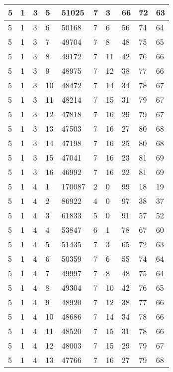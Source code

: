 \begin{table}[!ht]
\begin{tabular}{|l|l|l|l|l|l|l|l|l|l|}
        5 & 1 & 3 & 5 & 51025 & 7 & 3 & 66 & 72 & 63 \\ \hline
        5 & 1 & 3 & 6 & 50168 & 7 & 6 & 56 & 74 & 64 \\ \hline
        5 & 1 & 3 & 7 & 49704 & 7 & 8 & 48 & 75 & 65 \\ \hline
        5 & 1 & 3 & 8 & 49172 & 7 & 11 & 42 & 76 & 66 \\ \hline
        5 & 1 & 3 & 9 & 48975 & 7 & 12 & 38 & 77 & 66 \\ \hline
        5 & 1 & 3 & 10 & 48472 & 7 & 14 & 34 & 78 & 67 \\ \hline
        5 & 1 & 3 & 11 & 48214 & 7 & 15 & 31 & 79 & 67 \\ \hline
        5 & 1 & 3 & 12 & 47818 & 7 & 16 & 29 & 79 & 67 \\ \hline
        5 & 1 & 3 & 13 & 47503 & 7 & 16 & 27 & 80 & 68 \\ \hline
        5 & 1 & 3 & 14 & 47198 & 7 & 16 & 25 & 80 & 68 \\ \hline
        5 & 1 & 3 & 15 & 47041 & 7 & 16 & 23 & 81 & 69 \\ \hline
        5 & 1 & 3 & 16 & 46992 & 7 & 16 & 22 & 81 & 69 \\ \hline
        5 & 1 & 4 & 1 & 170087 & 2 & 0 & 99 & 18 & 19 \\ \hline
        5 & 1 & 4 & 2 & 86922 & 4 & 0 & 97 & 38 & 37 \\ \hline
        5 & 1 & 4 & 3 & 61833 & 5 & 0 & 91 & 57 & 52 \\ \hline
        5 & 1 & 4 & 4 & 53847 & 6 & 1 & 78 & 67 & 60 \\ \hline
        5 & 1 & 4 & 5 & 51435 & 7 & 3 & 65 & 72 & 63 \\ \hline
        5 & 1 & 4 & 6 & 50359 & 7 & 6 & 55 & 74 & 64 \\ \hline
        5 & 1 & 4 & 7 & 49997 & 7 & 8 & 48 & 75 & 64 \\ \hline
        5 & 1 & 4 & 8 & 49304 & 7 & 10 & 42 & 76 & 65 \\ \hline
        5 & 1 & 4 & 9 & 48920 & 7 & 12 & 38 & 77 & 66 \\ \hline
        5 & 1 & 4 & 10 & 48686 & 7 & 14 & 34 & 78 & 66 \\ \hline
        5 & 1 & 4 & 11 & 48520 & 7 & 15 & 31 & 78 & 66 \\ \hline
        5 & 1 & 4 & 12 & 48003 & 7 & 15 & 29 & 79 & 67 \\ \hline
        5 & 1 & 4 & 13 & 47766 & 7 & 16 & 27 & 79 & 68 \\ \hline

\end{tabular}
\end{table}
